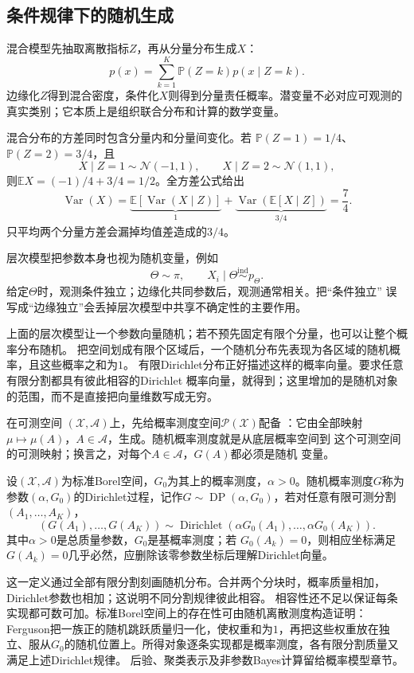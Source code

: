 \subsection{条件规律下的随机生成}
\label{sec:rv-random-generation}
混合模型先抽取离散指标\(Z\)，再从分量分布生成\(X\)：
\[ p(x)=\sum_{k=1}^{K}\mathbb{P}(Z=k)p(x\mid Z=k). \]
边缘化\(Z\)得到混合密度，条件化\(X\)则得到分量责任概率。潜变量不必对应可观测的真实类别；它本质上是组织联合分布和计算的数学变量。

混合分布的方差同时包含分量内和分量间变化。若
\(\mathbb{P}(Z=1)=1/4\)、\(\mathbb{P}(Z=2)=3/4\)，且
\[
  X\mid Z=1\sim\mathcal{N}(-1,1),\qquad
  X\mid Z=2\sim\mathcal{N}(1,1),
\]
则\(\mathbb{E}X=(-1)/4+3/4=1/2\)。全方差公式给出
\[
  \operatorname{Var}(X)
  =\underbrace{\mathbb{E}[\operatorname{Var}(X\mid Z)]}_{1}
   +\underbrace{\operatorname{Var}(\mathbb{E}[X\mid Z])}_{3/4}
  =\frac74.
\]
只平均两个分量方差会漏掉均值差造成的\(3/4\)。

层次模型把参数本身也视为随机变量，例如
\[ \Theta\sim\pi,\qquad
  X_i\mid\Theta\mathrel{\overset{\mathrm{ind}}{\sim}}p_\Theta. \]
给定\(\Theta\)时，观测条件独立；边缘化共同参数后，观测通常相关。把“条件独立”
误写成“边缘独立”会丢掉层次模型中共享不确定性的主要作用。

上面的层次模型让一个参数向量随机；若不预先固定有限个分量，也可以让整个概率分布随机。
把空间划成有限个区域后，一个随机分布先表现为各区域的随机概率，且这些概率之和为$1$。
有限Dirichlet分布正好描述这样的概率向量。要求任意有限分割都具有彼此相容的Dirichlet
概率向量，就得到；这里增加的是随机对象的范围，而不是直接把向量维数写成无穷。
\begin{definition}[随机概率测度]
  \label{def:probability-random-probability-measure}
在可测空间
\((\mathcal X,\mathcal A)\)上，先给概率测度空间\(\mathcal P(\mathcal X)\)配备
：它由全部映射
\(\mu\mapsto\mu(A)\)，\(A\in\mathcal A\)，生成。随机概率测度就是从底层概率空间到
这个可测空间的可测映射；换言之，对每个\(A\in\mathcal A\)，\(G(A)\)都必须是随机
变量。
\end{definition}
\begin{definition}[Dirichlet过程]
  \label{def:probability-dirichlet-process}
  设\((\mathcal X,\mathcal A)\)为标准Borel空间，\(G_0\)为其上的概率测度，\(\alpha>0\)。随机概率测度\(G\)称为参数\((\alpha,G_0)\)的Dirichlet过程，记作\(G\sim\operatorname{DP}(\alpha,G_0)\)，若对任意有限可测分割
\((A_1,\ldots,A_K)\)，
\[ (G(A_1),\ldots,G(A_K))
  \sim\operatorname{Dirichlet}(\alpha G_0(A_1),\ldots,\alpha G_0(A_K)). \]
其中\(\alpha>0\)是总质量参数，\(G_0\)是基概率测度；若
\(G_0(A_k)=0\)，则相应坐标满足\(G(A_k)=0\)几乎必然，应删除该零参数坐标后理解Dirichlet向量。
\end{definition}
这一定义通过全部有限分割刻画随机分布。合并两个分块时，概率质量相加，Dirichlet参数也相加；这说明不同分割规律彼此相容。
相容性还不足以保证每条实现都可数可加。标准Borel空间上的存在性可由随机离散测度构造证明：Ferguson把一族正的随机跳跃质量归一化，使权重和为\(1\)，再把这些权重放在独立、服从\(G_0\)的随机位置上。所得对象逐条实现都是概率测度，各有限分割质量又满足上述Dirichlet规律。
后验、聚类表示及非参数Bayes计算留给概率模型章节。


